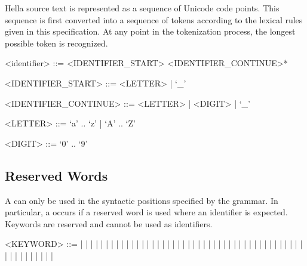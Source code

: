 \documentclass[makeidx]{article}
\begin{document}
\LMHash{}%
Hella source text is represented as a sequence of Unicode code points.
This sequence is first converted into a sequence of tokens
according to the lexical rules given in this specification.
At any point in the tokenization process,
the longest possible token is recognized.

\begin{grammar}
<identifier> ::= <IDENTIFIER\_START> <IDENTIFIER\_CONTINUE>*

<IDENTIFIER\_START> ::= <LETTER> | `_'

<IDENTIFIER\_CONTINUE> ::= <LETTER> | <DIGIT> | `_'

<LETTER> ::= `a' .. `z' | `A' .. `Z'

<DIGIT> ::= `0' .. `9'
\end{grammar}


\subsection{Reserved Words}

\LMHash{}%
A  can only be used in the syntactic positions
specified by the grammar.
In particular, a  occurs if a reserved word is used
where an identifier is expected.
Keywords are reserved and cannot be used as identifiers.


\begin{grammar}
<KEYWORD> ::= \gnewline{}
  \AND{} | \ANY{} | \ARR{} | \ASSERT{} | \ASYNC{} | \AWAIT{} | \BOOL{}
    | \BREAK{} | \CLASS{}
  \alt\hspace{-3mm} \CONST{} | \CONTINUE{} | \DEBUGASSERT{} | \DEFER{}
    | \DELETE{} | \DISTINCT{} | \DO{} | \DOUBLE{}
  \alt\hspace{-3mm} \ELSE{} | \ENUM{} | \EXPLICIT{} | \EXTENDS{}
    | \EXTERN{} | \FLOAT{} | \FOR{}
  \alt\hspace{-3mm} \FUNCTION{} | \IF{} | \IMPLEMENTS{} | \IMPORT{}
    | \IN{} | \INIT{} | \INT{}
  \alt\hspace{-3mm} \IS{} | \LOOP{} | \MATCH{} | \NEW{} | \NOT{} | \NULL{}
    | \OPEN{} | \OPERATOR{}
  \alt\hspace{-3mm} \OR{} | \OUT{} | \OWN{} | \OVERRIDE{} | \PRIVATE{}
    | \PUBLIC{} | \REF{} | \RETURN{} | \SCOPE{}
  \alt\hspace{-3mm} \SEALED{} | \SPAWN{} | \STATIC{} | \STRING{} | \STRUCT{}
    | \SUPER{} | \THIS{} | \TRAIT{}
  \alt\hspace{-3mm} \TYPEDEF{} | \VOID{} | \VEC{} | \WHILE{} | \WHERE{}
    | \YIELD{}
\end{grammar}
\end{document}
